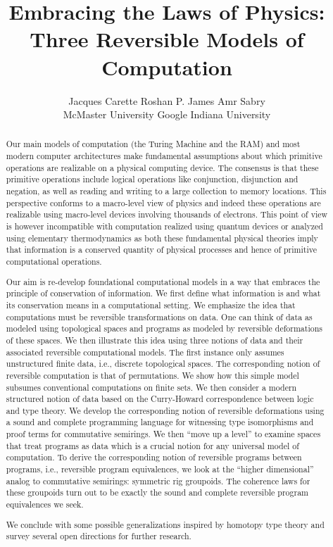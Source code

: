 \documentclass{article}
\title{Embracing the Laws of Physics: \\ Three Reversible Models of Computation}
\author{Jacques Carette \qquad\qquad Roshan P. James \qquad\qquad Amr Sabry \\
McMaster University \qquad\qquad Google \qquad\qquad Indiana University}
\begin{document}
\maketitle

\begin{abstract}
  Our main models of computation (the Turing Machine and the RAM) and
  most modern computer architectures make fundamental assumptions
  about which primitive operations are realizable on a physical
  computing device. The consensus is that these primitive operations
  include logical operations like conjunction, disjunction and
  negation, as well as reading and writing to a large collection to
  memory locations. This perspective conforms to a macro-level view of
  physics and indeed these operations are realizable using macro-level
  devices involving thousands of electrons. This point of view is
  however incompatible with computation realized using quantum devices
  or analyzed using elementary thermodynamics as both these
  fundamental physical theories imply that information is a conserved
  quantity of physical processes and hence of primitive computational
  operations.

  Our aim is re-develop foundational computational models in a way
  that embraces the principle of conservation of information. We first
  define what information is and what its conservation means in a
  computational setting. We emphasize the idea that computations must
  be reversible transformations on data. One can think of data as
  modeled using topological spaces and programs as modeled by
  reversible deformations of these spaces. We then illustrate this
  idea using three notions of data and their associated reversible
  computational models. The first instance only assumes unstructured
  finite data, i.e., discrete topological spaces. The corresponding
  notion of reversible computation is that of permutations. We show
  how this simple model subsumes conventional computations on finite
  sets. We then consider a modern structured notion of data based on
  the Curry-Howard correspondence between logic and type theory. We
  develop the corresponding notion of reversible deformations using a
  sound and complete programming language for witnessing type
  isomorphisms and proof terms for commutative semirings.  We then
  ``move up a level'' to examine spaces that treat programs as data
  which is a crucial notion for any universal model of computation. To
  derive the corresponding notion of reversible programs between
  programs, i.e., reversible program equivalences, we look at the
  ``higher dimensional'' analog to commutative semirings: symmetric
  rig groupoids. The coherence laws for these groupoids turn out to be
  exactly the sound and complete reversible program equivalences we
  seek.

  We conclude with some possible generalizations inspired by homotopy
  type theory and survey several open directions for further research.

\end{abstract}
\end{document}
